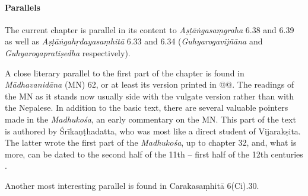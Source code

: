
\paragraph*{Parallels}
The current chapter is parallel in its content to \textit{Aṣṭāṅgasaṃgraha} 6.38 
and 6.39 as well as \textit{Aṣṭāṅgahṛdayasaṃhitā} 6.33 and 6.34 
(\textit{Guhyarogavijñāna} and \textit{Guhyarogapratiṣedha} respectively).%

A close literary parallel to the first part of the chapter is found in 
\textit{Mādhavanidāna} (MN) 62, or at least its version printed in @@\citet{}. The 
readings of the MN as it stands now usually side with the vulgate version rather 
than with the Nepalese. In addition to the basic text, there are several valuable 
pointers made in the \textit{Madhukośa}, an early commentary on the MN. This 
part of the text is authored by Śrīkaṇṭhadatta, who was most like a direct student 
of Vijarakṣita. The latter wrote the first part of the \textit{Madhukośa}, up to 
chapter 32, and, what is more, can be dated to the second half of the 11th -- first 
half of the 12th centuries \citep[22--26]{meul-1974}.

Another most interesting parallel is found in Carakasaṃhitā 6(Ci).30.

